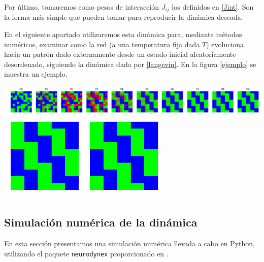 \documentclass[titlepage,12pt]{article}
\numberwithin{equation}{section}
\begin{document}
	Por último, tomaremos como pesos de interacción $J_{ij}$ los definidos en \eqref{Jint}. Son la forma más simple que pueden tomar para reproducir la dinámica deseada. 
	
	En el siguiente apartado utilizaremos esta dinámica para, mediante métodos numéricos, examinar como la red (a una temperatura fija dada $T$) evoluciona hacia un patrón dado externamente desde un estado inicial aleatoriamente desordenado, siguiendo la dinámica dada por \eqref{langevin}. En la figura \ref{ejemplo} se muestra un ejemplo.
	\begin{center}
		\includegraphics[width=16cm]{pasos.png}
		\includegraphics[width=4cm]{final.png} \includegraphics[width=4cm]{patron.png}
		 \label{ejemplo}
	\end{center}
	\subsection{Simulación numérica de la dinámica}
	En esta sección presentamos una simulación numérica llevada a cabo en Python, utilizando el paquete \verb|neurodynex| proporcionado en \cite{neurodyn-ex}.
	
\end{document}
